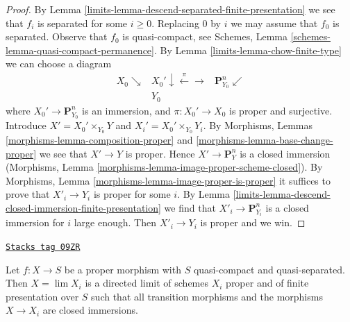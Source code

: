 \begin{proof}

By Lemma \ref{limits-lemma-descend-separated-finite-presentation} we see that
$f_i$ is separated for some $i \geq 0$. Replacing
$0$ by $i$ we may assume that $f_0$ is separated.
Observe that $f_0$ is quasi-compact, see
Schemes, Lemma \ref{schemes-lemma-quasi-compact-permanence}.
By Lemma \ref{limits-lemma-chow-finite-type} we can choose a diagram
$$
\begin{array}{ccc}X_0 \searrow & X_0' \downarrow\overset{\pi}{\longleftarrow}\longrightarrow & \mathbf{P}^n_{Y_0} \swarrow \\  & Y_0 & \end{array}
$$
where $X_0' \to \mathbf{P}^n_{Y_0}$ is an immersion, and
$\pi : X_0' \to X_0$ is proper and surjective. Introduce
$X' = X_0' \times_{Y_0} Y$ and $X_i' = X_0' \times_{Y_0} Y_i$.
By Morphisms, Lemmas \ref{morphisms-lemma-composition-proper} and
\ref{morphisms-lemma-base-change-proper}
we see that $X' \to Y$ is proper. Hence $X' \to \mathbf{P}^n_Y$ is
a closed immersion (Morphisms, Lemma
\ref{morphisms-lemma-image-proper-scheme-closed}). By
Morphisms, Lemma \ref{morphisms-lemma-image-proper-is-proper}
it suffices to prove that $X'_i \to Y_i$ is proper for some $i$.
By Lemma \ref{limits-lemma-descend-closed-immersion-finite-presentation}
we find that $X'_i \to \mathbf{P}^n_{Y_i}$ is
a closed immersion for $i$ large enough. Then $X'_i \to Y_i$
is proper and we win.
\end{proof}

\begin{lemma}
\label{limits-lemma-proper-limit-of-proper-finite-presentation}
\href{https://stacks.math.columbia.edu/tag/09ZR}{\texttt{Stacks tag 09ZR}}

Let $f : X \to S$ be a proper morphism with $S$ quasi-compact and
quasi-separated. Then $X = \lim X_i$ is a directed limit of schemes
$X_i$ proper and of finite presentation over $S$ such that
all transition morphisms and the morphisms $X \to X_i$ are closed
immersions.
\end{lemma}


